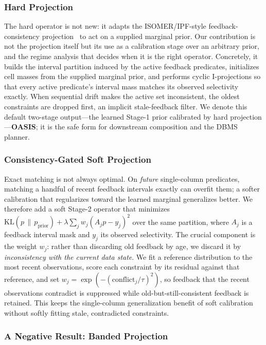 \documentclass[preprint,12pt]{elsarticle}
\begin{document}
\subsubsection{Hard Projection}

The hard operator is not new: it adapts the ISOMER/IPF-style feedback-consistency
projection~\cite{markl2007consistent} to act on a supplied marginal prior. Our
contribution is not the projection itself but its use as a calibration stage over
an arbitrary prior, and the regime analysis that decides when it is the right
operator. Concretely, it builds the interval partition induced by the active
feedback predicates, initializes cell masses from the supplied marginal prior, and
performs cyclic I-projections so that every active predicate's interval mass
matches its observed selectivity exactly. When sequential drift makes the active
set inconsistent, the oldest constraints are dropped first, an implicit
stale-feedback filter. We denote this default two-stage output---the learned
Stage-1 prior calibrated by hard projection---\textbf{OASIS}; it is the safe form
for downstream composition and the DBMS planner.

\subsubsection{Consistency-Gated Soft Projection}

Exact matching is not always optimal. On \emph{future} single-column predicates,
matching a handful of recent feedback intervals exactly can overfit them; a
softer calibration that regularizes toward the learned marginal generalizes
better. We therefore add a soft Stage-2 operator that minimizes
$\mathrm{KL}(p\,\|\,p_{\text{prior}}) + \lambda \sum_j w_j (A_j p - y_j)^2$ over
the same partition, where $A_j$ is a feedback interval mask and $y_j$ its
observed selectivity. The crucial component is the weight $w_j$: rather than
discarding old feedback by age, we discard it by \emph{inconsistency with the
current data state}. We fit a reference distribution to the most recent
observations, score each constraint by its residual against that reference, and
set $w_j = \exp(-(\text{conflict}_j/\tau)^2)$, so feedback that the recent
observations contradict is suppressed while old-but-still-consistent feedback is
retained. This keeps the single-column generalization benefit of soft
calibration without softly fitting stale, contradicted constraints.

\subsubsection{A Negative Result: Banded Projection}
\end{document}
